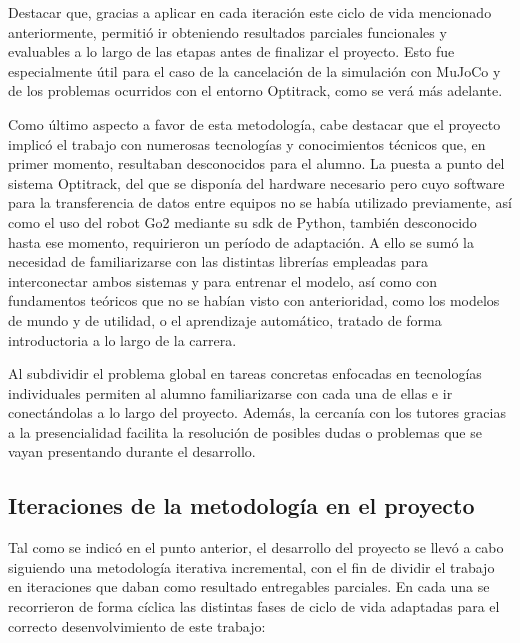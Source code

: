 Destacar que, gracias a aplicar en cada iteración este ciclo de vida mencionado anteriormente, permitió ir 
obteniendo resultados parciales funcionales y evaluables a lo largo de las etapas antes de finalizar el 
proyecto. Esto fue especialmente útil para el caso de la cancelación de la simulación con MuJoCo y de los problemas 
ocurridos con el entorno Optitrack, como se verá más adelante.

Como último aspecto a favor de esta metodología, cabe destacar que el proyecto implicó el trabajo con numerosas tecnologías 
y conocimientos técnicos que, en primer momento, resultaban desconocidos para el alumno. La puesta a punto del sistema Optitrack, 
del que se disponía del hardware necesario pero cuyo software para la transferencia de datos entre equipos no se había utilizado 
previamente, así como el uso del robot Go2 mediante su \gls{sdk} de Python, también desconocido hasta ese momento, requirieron 
un período de adaptación. A ello se sumó la necesidad de familiarizarse con las distintas librerías empleadas para interconectar 
ambos sistemas y para entrenar el modelo, así como con fundamentos teóricos que no se habían visto con anterioridad, como los 
modelos de mundo y de utilidad, o el aprendizaje automático, tratado de forma introductoria a lo largo de la carrera.

Al subdividir el problema global en tareas concretas enfocadas en tecnologías individuales permiten al alumno familiarizarse 
con cada una de ellas e ir conectándolas a lo largo del proyecto. Además, la cercanía con los tutores gracias a la presencialidad 
facilita la resolución de posibles dudas o problemas que se vayan presentando durante el desarrollo.



\subsection{Iteraciones de la metodología en el proyecto}
\label{sec:iteraciones_metodologia}

Tal como se indicó en el punto anterior, el desarrollo del proyecto se llevó a cabo siguiendo una metodología 
iterativa incremental, con el fin de dividir el trabajo en iteraciones que daban como resultado entregables parciales. 
En cada una se recorrieron de forma cíclica las distintas fases de ciclo de vida adaptadas para el correcto 
desenvolvimiento de este trabajo:

